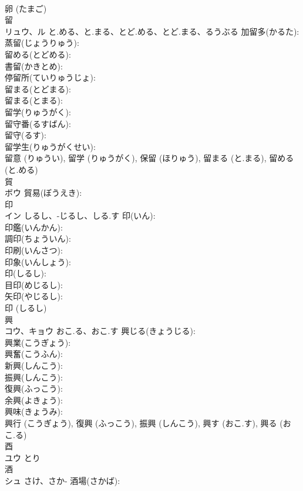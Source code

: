 \documentclass[8pt]{extreport}
\begin{document}
\begin{CJK}{UTF8}{min}
\\	卵 (たまご)
\\	留			
\\	リュウ、ル	と.める、と.まる、とど.める、とど.まる、るうぶる	加留多(かるた): 
\\	蒸留(じょうりゅう): 
\\	留める(とどめる): 
\\	書留(かきとめ): 
\\	停留所(ていりゅうじょ): 
\\	留まる(とどまる): 
\\	留まる(とまる): 
\\	留学(りゅうがく): 
\\	留守番(るすばん): 
\\	留守(るす): 
\\	留学生(りゅうがくせい): 
\\	留意 (りゅうい), 留学 (りゅうがく), 保留 (ほりゅう), 留まる (と.まる), 留める (と.める)
\\	貿			
\\	ボウ		貿易(ぼうえき): 
\\	印			
\\	イン	しるし、-じるし、しる.す	印(いん): 
\\	印鑑(いんかん): 
\\	調印(ちょういん): 
\\	印刷(いんさつ): 
\\	印象(いんしょう): 
\\	印(しるし): 
\\	目印(めじるし): 
\\	矢印(やじるし): 
\\	印 (しるし)
\\	興			
\\	コウ、キョウ	おこ.る、おこ.す	興じる(きょうじる): 
\\	興業(こうぎょう): 
\\	興奮(こうふん): 
\\	新興(しんこう): 
\\	振興(しんこう): 
\\	復興(ふっこう): 
\\	余興(よきょう): 
\\	興味(きょうみ): 
\\	興行 (こうぎょう), 復興 (ふっこう), 振興 (しんこう), 興す (おこ.す), 興る (おこ.る)
\\	酉			
\\	ユウ	とり		
\\	酒			
\\	シュ	さけ、さか-	酒場(さかば): 

\end{CJK}
\end{document}
